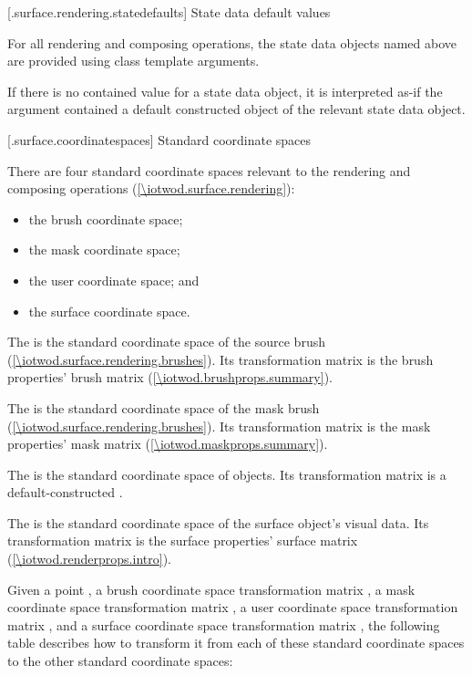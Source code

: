  [\iotwod.surface.rendering.statedefaults] {State data default values}

\pnum
For all rendering and composing operations, the state data objects named above are provided using  class template arguments.

\pnum
If there is no contained value for a state data object, it is interpreted as-if the  argument contained a default constructed object of the relevant state data object.

 [\iotwod.surface.coordinatespaces] {Standard coordinate spaces}

\pnum
There are four standard coordinate spaces relevant to the rendering and composing operations (\ref{\iotwod.surface.rendering}):
\begin{itemize}
\item the brush coordinate space;
\item the mask coordinate space;
\item the user coordinate space; and
\item the surface coordinate space.
\end{itemize}

\pnum
The  is the standard coordinate space of the source brush (\ref{\iotwod.surface.rendering.brushes}). Its transformation matrix is the brush properties' brush matrix (\ref{\iotwod.brushprops.summary}).

\pnum
The  is the standard coordinate space of the mask brush (\ref{\iotwod.surface.rendering.brushes}). Its transformation matrix is the mask properties' mask matrix (\ref{\iotwod.maskprops.summary}).

\pnum
The  is the standard coordinate space of  objects. Its transformation matrix is a default-constructed .

\pnum
The  is the standard coordinate space of the surface object's visual data. Its transformation matrix is the surface properties' surface matrix (\ref{\iotwod.renderprops.intro}).

\pnum
Given a point , a brush coordinate space transformation matrix , a mask coordinate space transformation matrix , a user coordinate space transformation matrix , and a surface coordinate space transformation matrix , the following table describes how to transform it from each of these standard coordinate spaces to the other standard coordinate spaces:

